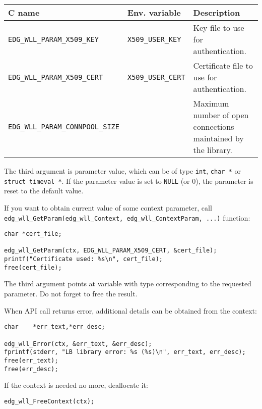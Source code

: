\begin{table}[h]
\begin{tabularx}{\textwidth}{llX}
{\bf C name} & {\bf Env. variable} & {\bf Description} \\
\hline
\lstinline'EDG_WLL_PARAM_X509_KEY' & \lstinline'X509_USER_KEY' & Key file to use for
authentication. \\
\lstinline'EDG_WLL_PARAM_X509_CERT' & \lstinline'X509_USER_CERT' & Certificate file to use
for authentication. \\
\lstinline'EDG_WLL_PARAM_CONNPOOL_SIZE' & & Maximum number
of open connections maintained by the library. \\
\end{tabularx}
\end{table}

The third argument is parameter value, which can be of type
\lstinline'int', \lstinline'char *' or \lstinline'struct timeval *'. 
If the parameter value is set to \lstinline'NULL' (or 0), the 
parameter is reset to the default value.

If you want to obtain current value of some context parameter, call
\lstinline'edg_wll_GetParam(edg_wll_Context, edg_wll_ContextParam, ...)' function:
\begin{lstlisting}
char *cert_file;

edg_wll_GetParam(ctx, EDG_WLL_PARAM_X509_CERT, &cert_file);
printf("Certificate used: %s\n", cert_file);
free(cert_file);
\end{lstlisting}
The third argument points at variable with type corresponding to the
requested parameter. Do not forget to free the result.


%
When \LB API call returns error, additional details can be obtained
from the context:
\begin{lstlisting}
char    *err_text,*err_desc;
        
edg_wll_Error(ctx, &err_text, &err_desc);
fprintf(stderr, "LB library error: %s (%s)\n", err_text, err_desc);
free(err_text);
free(err_desc);
\end{lstlisting}

%
If the context is needed no more, deallocate it:
\begin{lstlisting}
edg_wll_FreeContext(ctx);
\end{lstlisting}

